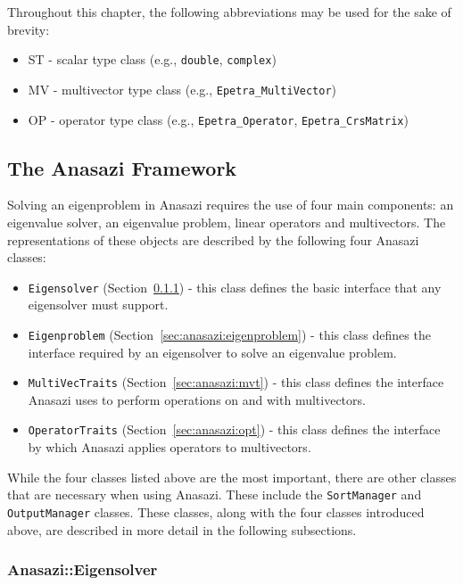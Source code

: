 Throughout this chapter, the following abbreviations may be used for the sake of
brevity:
\begin{itemize}
\item ST - scalar type class (e.g., \verb!double!, \verb!complex!)
\item MV - multivector type class (e.g., \verb!Epetra_MultiVector!)
\item OP - operator type class (e.g., \verb!Epetra_Operator!, \verb!Epetra_CrsMatrix!)
\end{itemize}

\subsection{The Anasazi Framework}
\label{sec:anasazi:framework}

Solving an eigenproblem in Anasazi requires the use of four main components: an
eigenvalue solver, an eigenvalue problem, linear operators and multivectors.
The representations of these objects are described by the following four
Anasazi classes:
\begin{itemize}
\item \verb!Eigensolver! (Section~\ref{sec:anasazi:eigensolver}) - this class defines the basic interface that any
eigensolver must support.
\item \verb!Eigenproblem! (Section~\ref{sec:anasazi:eigenproblem}) - this class defines the interface required by an
eigensolver to solve an eigenvalue problem.
\item \verb!MultiVecTraits! (Section~\ref{sec:anasazi:mvt}) - this class defines the interface Anasazi uses to 
perform operations on and with multivectors.
\item \verb!OperatorTraits! (Section~\ref{sec:anasazi:opt}) - this class defines the interface by which Anasazi
applies operators to multivectors.
\end{itemize}

While the four classes listed above are the most important, there are other
classes that are necessary when using Anasazi. These include the
\verb!SortManager! and \verb!OutputManager! classes. These classes, along with
the four classes introduced above, are described in more detail in the following
subsections.

\subsubsection{Anasazi::Eigensolver}
\label{sec:anasazi:eigensolver}

